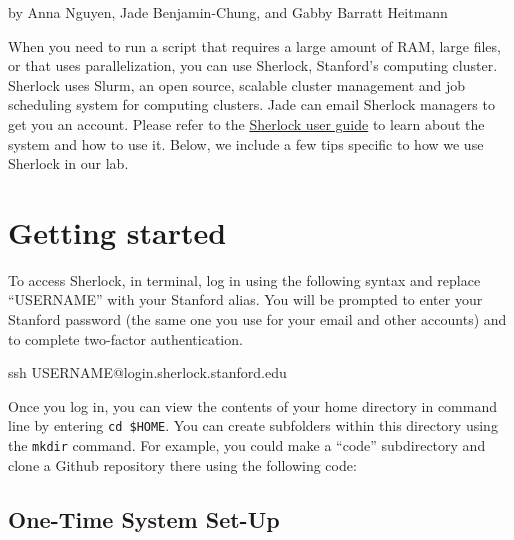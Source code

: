 \documentclass[
]{book}
\newenvironment{Shaded}{\begin{snugshade}}{\end{snugshade}}
\newcommand{\NormalTok}[1]{#1}
\begin{document}
by Anna Nguyen, Jade Benjamin-Chung, and Gabby Barratt Heitmann

When you need to run a script that requires a large amount of RAM, large files, or that uses parallelization, you can use Sherlock, Stanford's computing cluster. Sherlock uses Slurm, an open source, scalable cluster management and job scheduling system for computing clusters. Jade can email Sherlock managers to get you an account. Please refer to the \href{https://www.sherlock.stanford.edu/docs/overview/introduction/}{Sherlock user guide} to learn about the system and how to use it. Below, we include a few tips specific to how we use Sherlock in our lab.

\section{Getting started}\label{getting-started}

To access Sherlock, in terminal, log in using the following syntax and replace ``USERNAME'' with your Stanford alias. You will be prompted to enter your Stanford password (the same one you use for your email and other accounts) and to complete two-factor authentication.

\begin{Shaded}
\begin{Highlighting}[]
\NormalTok{ssh USERNAME@login.sherlock.stanford.edu}
\end{Highlighting}
\end{Shaded}

Once you log in, you can view the contents of your home directory in command line by entering \texttt{cd\ \$HOME}. You can create subfolders within this directory using the \texttt{mkdir} command. For example, you could make a ``code'' subdirectory and clone a Github repository there using the following code:

\begin{Shaded}
\end{Shaded}

\subsection{One-Time System Set-Up}\label{one-time-system-set-up}
\end{document}
